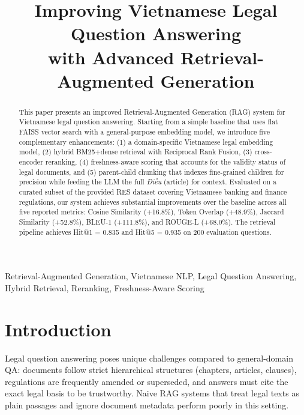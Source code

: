 \documentclass[conference]{IEEEtran}
\begin{document}
\title{Improving Vietnamese Legal Question Answering\\
with Advanced Retrieval-Augmented Generation}

\author{
}

\maketitle

\begin{abstract}
This paper presents an improved Retrieval-Augmented Generation (RAG) system
for Vietnamese legal question answering. Starting from a simple baseline that
uses flat FAISS vector search with a general-purpose embedding model, we
introduce five complementary enhancements: (1) a domain-specific Vietnamese
legal embedding model, (2) hybrid BM25+dense retrieval with Reciprocal Rank
Fusion, (3) cross-encoder reranking, (4) freshness-aware scoring that accounts
for the validity status of legal documents, and (5) parent-child chunking that
indexes fine-grained children for precision while feeding the LLM the full
\emph{Điều} (article) for context. Evaluated on a curated subset of the
provided RES dataset covering Vietnamese banking and finance regulations,
our system achieves substantial improvements over the baseline across all five
reported metrics: Cosine Similarity (+16.8\%), Token Overlap (+48.9\%),
Jaccard Similarity (+52.8\%), BLEU-1 (+111.8\%), and ROUGE-L (+68.0\%).
The retrieval pipeline achieves Hit@1 = 0.835 and Hit@5 = 0.935 on
200 evaluation questions.
\end{abstract}

\begin{IEEEkeywords}
Retrieval-Augmented Generation, Vietnamese NLP, Legal Question Answering,
Hybrid Retrieval, Reranking, Freshness-Aware Scoring
\end{IEEEkeywords}

\section{Introduction}

Legal question answering poses unique challenges compared to general-domain
QA: documents follow strict hierarchical structures (chapters, articles,
clauses), regulations are frequently amended or superseded, and answers must
cite the exact legal basis to be trustworthy. Naive RAG systems that treat
legal texts as plain passages and ignore document metadata perform poorly in
this setting.
\end{document}

